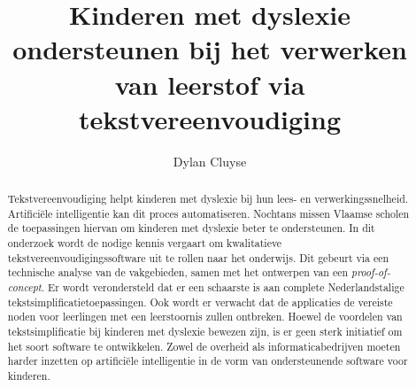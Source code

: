 \documentclass{hogent-article}
\title{Kinderen met dyslexie ondersteunen bij het verwerken van leerstof via tekstvereenvoudiging}
\author{Dylan Cluyse}
\begin{document}
\begin{abstract}
 Tekstvereenvoudiging helpt kinderen met dyslexie bij hun lees- en verwerkingssnelheid. Artificiële intelligentie kan dit proces automatiseren. Nochtans missen Vlaamse scholen de toepassingen hiervan om kinderen met dyslexie beter te ondersteunen. In dit onderzoek wordt de nodige kennis vergaart om kwalitatieve tekstvereenvoudigingssoftware uit te rollen naar het onderwijs. Dit gebeurt via een technische analyse van de vakgebieden, samen met het ontwerpen van een \textit{proof-of-concept}. Er wordt verondersteld dat er een schaarste is aan complete Nederlandstalige tekstsimplificatietoepassingen. Ook wordt er verwacht dat de applicaties de vereiste noden voor leerlingen met een leerstoornis zullen ontbreken. Hoewel de voordelen van tekstsimplificatie bij kinderen met dyslexie bewezen zijn, is er geen sterk initiatief om het soort software te ontwikkelen. Zowel de overheid als informaticabedrijven moeten harder inzetten op artificiële intelligentie in de vorm van ondersteunende software voor kinderen.
\end{abstract}

\tableofcontents



\printbibliography[heading=bibintoc]
\end{document}

